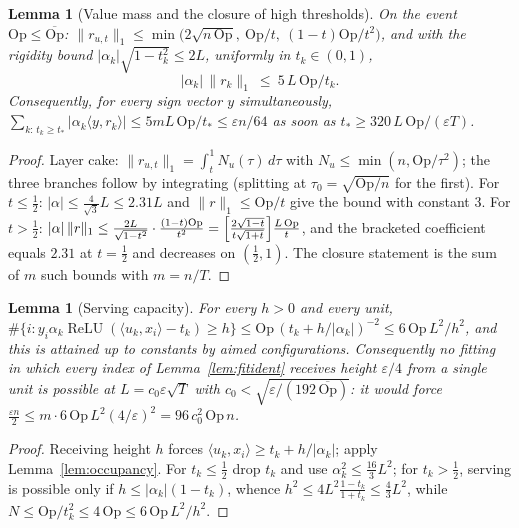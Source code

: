 \documentclass[11pt,reqno]{amsart}
\theoremstyle{plain}
\newtheorem{lemma}[theorem]{Lemma}
\theoremstyle{definition}
\theoremstyle{remark}
\newcommand{\eps}{\varepsilon}
\newcommand{\relu}{\operatorname{ReLU}}
\newcommand{\inn}[2]{\langle #1,#2\rangle}
\begin{document}
\begin{lemma}[Value mass and the closure of high thresholds]\label{lem:valuemass}
On the event $\mathrm{Op}\le\overline{\mathrm{Op}}$: $\|r_{u,t}\|_1\le\min\bigl(2\sqrt{n\,\mathrm{Op}},\ \mathrm{Op}/t,\ (1-t)\mathrm{Op}/t^2\bigr)$, and with the rigidity bound $|\alpha_k|\sqrt{1-t_k^2}\le2L$, uniformly in $t_k\in(0,1)$,
\[
|\alpha_k|\,\|r_k\|_1\ \le\ 5\,L\,\mathrm{Op}/t_k .
\]
Consequently, for every sign vector $y$ simultaneously, $\sum_{k:\,t_k\ge t_\ast}|\alpha_k\inn y{r_k}|\le5mL\,\mathrm{Op}/t_\ast\le\eps n/64$ as soon as $t_\ast\ge320\,L\,\mathrm{Op}/(\eps T)$.
\end{lemma}
\begin{proof}[Proof]
Layer cake: $\|r_{u,t}\|_1=\int_t^1N_u(\tau)\,d\tau$ with $N_u\le\min(n,\mathrm{Op}/\tau^2)$; the three branches follow by integrating (splitting at $\tau_0=\sqrt{\mathrm{Op}/n}$ for the first). For $t\le\tfrac12$: $|\alpha|\le\tfrac4{\sqrt3}L\le2.31L$ and $\|r\|_1\le\mathrm{Op}/t$ give the bound with constant $3$. For $t>\tfrac12$: $|\alpha|\,\|r\|_1\le\frac{2L}{\sqrt{1-t^2}}\cdot\frac{(1-t)\mathrm{Op}}{t^2}=\Bigl[\frac{2\sqrt{1-t}}{t\sqrt{1+t}}\Bigr]\frac{L\,\mathrm{Op}}t$, and the bracketed coefficient equals $2.31$ at $t=\tfrac12$ and decreases on $(\tfrac12,1)$. The closure statement is the sum of $m$ such bounds with $m=n/T$.
\end{proof}

\begin{lemma}[Serving capacity]\label{lem:serving}
For every $h>0$ and every unit, $\#\{i:y_i\alpha_k\relu(\inn{u_k}{x_i}-t_k)\ge h\}\le\mathrm{Op}\,(t_k+h/|\alpha_k|)^{-2}\le6\,\mathrm{Op}\,L^2/h^2$, and this is attained up to constants by aimed configurations. Consequently no fitting in which every index of Lemma~\ref{lem:fitident} receives height $\eps/4$ from a single unit is possible at $L=c_0\eps\sqrt T$ with $c_0<\sqrt{\eps/(192\,\overline{\mathrm{Op}})}$: it would force $\tfrac{\eps n}2\le m\cdot6\,\mathrm{Op}\,L^2(4/\eps)^2=96\,c_0^2\,\mathrm{Op}\,n$.
\end{lemma}
\begin{proof}[Proof]
Receiving height $h$ forces $\inn{u_k}{x_i}\ge t_k+h/|\alpha_k|$; apply Lemma~\ref{lem:occupancy}. For $t_k\le\tfrac12$ drop $t_k$ and use $\alpha_k^2\le\tfrac{16}3L^2$; for $t_k>\tfrac12$, serving is possible only if $h\le|\alpha_k|(1-t_k)$, whence $h^2\le4L^2\frac{1-t_k}{1+t_k}\le\tfrac43L^2$, while $N\le\mathrm{Op}/t_k^2\le4\,\mathrm{Op}\le6\,\mathrm{Op}\,L^2/h^2$.
\end{proof}
\end{document}

